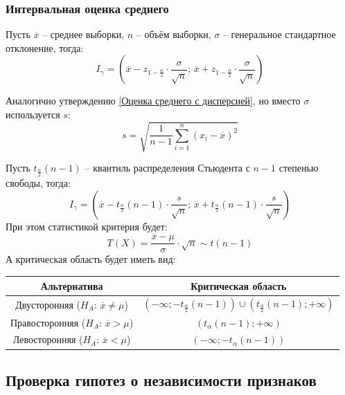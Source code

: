 \documentclass[12pt]{article}
\begin{document}
\subsubsection{Интервальная оценка среднего}
\begin{statement}\label{Оценка среднего с дисперсией}
    Пусть $\overline{x}$ – среднее выборки, $n$ – объём выборки, $\sigma$ – генеральное стандартное отклонение, тогда:
    $$I_\gamma=\left(\overline{x}-z_{1-\frac{\alpha}{2}}\cdot\frac{\sigma}{\sqrt{n}};\,\overline{x}+z_{1-\frac{\alpha}{2}}\cdot\frac{\sigma}{\sqrt{n}}\right)$$
\end{statement}
\begin{statement}
    Аналогично утверждению \ref{Оценка среднего с дисперсией}, но вместо $\sigma$ используется $s$:
    $$s=\sqrt{\frac{1}{n-1}\sum_{i=1}^{n}(x_i-\overline{x})^2}$$
\end{statement}
\renewcommand{\arraystretch}{1.5}
\begin{statement}
    Пусть $t_{\frac{\alpha}{2}}(n-1)$ – квантиль распределения Стьюдента с $n-1$ степенью свободы, тогда:
    $$I_\gamma=\left(\overline{x}-t_{\frac{\alpha}{2}}(n-1)\cdot\frac{s}{\sqrt{n}};\,\overline{x}+t_{\frac{\alpha}{2}}(n-1)\cdot\frac{s}{\sqrt{n}}\right)$$
    При этом статистикой критерия будет:
    $$T(X)=\dfrac{\overline{x}-\mu}{\sigma}\cdot\sqrt{n}\sim t(n-1)$$
    А критическая область будет иметь вид:
    \begin{center}
        \begin{tabular}{c|c}
            Альтернатива & Критическая область \\
            \hline
            Двусторонняя ($H_A:\,\overline{x}\neq\mu$) & $(-\infty;-t_{\frac{\alpha}{2}}(n-1))\cup(t_{\frac{\alpha}{2}}(n-1);+\infty)$\\
            Правосторонняя ($H_A:\,\overline{x}>\mu$) & $(t_\alpha(n-1);+\infty)$\\
            Левосторонняя ($H_A:\,\overline{x}<\mu$) & $(-\infty;-t_\alpha(n-1))$
        \end{tabular}
    \end{center}
\end{statement}

\subsection{Проверка гипотез о независимости признаков}
\end{document}
